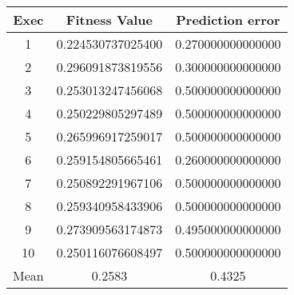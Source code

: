 \begin{table}[H]
\centering

\begin{tabular}{ccc}
\hline
Exec                     & Fitness Value                          & Prediction error                       \\ \hline
\multicolumn{1}{|c|}{1}  & \multicolumn{1}{c|}{0.224530737025400} & \multicolumn{1}{c|}{0.270000000000000} \\ \hline
\multicolumn{1}{|c|}{2}  & \multicolumn{1}{c|}{0.296091873819556} & \multicolumn{1}{c|}{0.300000000000000} \\ \hline
\multicolumn{1}{|c|}{3}  & \multicolumn{1}{c|}{0.253013247456068} & \multicolumn{1}{c|}{0.500000000000000} \\ \hline
\multicolumn{1}{|c|}{4}  & \multicolumn{1}{c|}{0.250229805297489} & \multicolumn{1}{c|}{0.500000000000000} \\ \hline
\multicolumn{1}{|c|}{5}  & \multicolumn{1}{c|}{0.265996917259017} & \multicolumn{1}{c|}{0.500000000000000} \\ \hline
\multicolumn{1}{|c|}{6}  & \multicolumn{1}{c|}{0.259154805665461} & \multicolumn{1}{c|}{0.260000000000000} \\ \hline
\multicolumn{1}{|c|}{7}  & \multicolumn{1}{c|}{0.250892291967106} & \multicolumn{1}{c|}{0.500000000000000} \\ \hline
\multicolumn{1}{|c|}{8}  & \multicolumn{1}{c|}{0.259340958433906} & \multicolumn{1}{c|}{0.500000000000000} \\ \hline
\multicolumn{1}{|c|}{9}  & \multicolumn{1}{c|}{0.273909563174873} & \multicolumn{1}{c|}{0.495000000000000} \\ \hline
\multicolumn{1}{|c|}{10} & \multicolumn{1}{c|}{0.250116076608497} & \multicolumn{1}{c|}{0.500000000000000} \\ \hline
Mean                     & 0.2583                                 & 0.4325                                 \\ \hline
\end{tabular}
\end{table}